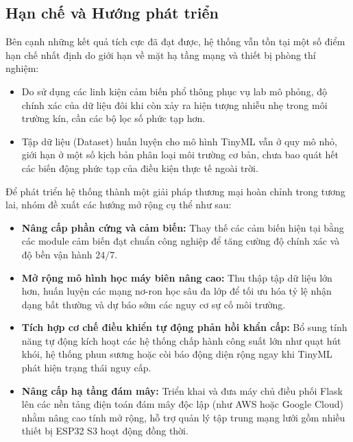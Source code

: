 \subsection{Hạn chế và Hướng phát triển}
Bên cạnh những kết quả tích cực đã đạt được, hệ thống vẫn tồn tại một số điểm hạn chế nhất định do giới hạn về mặt hạ tầng mạng và thiết bị phòng thí nghiệm:
\begin{itemize}
    \item Do sử dụng các linh kiện cảm biến phổ thông phục vụ lab mô phỏng, độ chính xác của dữ liệu đôi khi còn xảy ra hiện tượng nhiễu nhẹ trong môi trường kín, cần các bộ lọc số phức tạp hơn.
    \item Tập dữ liệu (Dataset) huấn luyện cho mô hình TinyML vẫn ở quy mô nhỏ, giới hạn ở một số kịch bản phân loại môi trường cơ bản, chưa bao quát hết các biến động phức tạp của điều kiện thực tế ngoài trời.
\end{itemize}

Để phát triển hệ thống thành một giải pháp thương mại hoàn chỉnh trong tương lai, nhóm đề xuất các hướng mở rộng cụ thể như sau:
\begin{itemize}
    \item \textbf{Nâng cấp phần cứng và cảm biến:} Thay thế các cảm biến hiện tại bằng các module cảm biến đạt chuẩn công nghiệp để tăng cường độ chính xác và độ bền vận hành $24/7$.
    \item \textbf{Mở rộng mô hình học máy biên nâng cao:} Thu thập tập dữ liệu lớn hơn, huấn luyện các mạng nơ-ron học sâu đa lớp để tối ưu hóa tỷ lệ nhận dạng bất thường và dự báo sớm các nguy cơ sự cố môi trường.
    \item \textbf{Tích hợp cơ chế điều khiển tự động phản hồi khẩn cấp:} Bổ sung tính năng tự động kích hoạt các hệ thống chấp hành công suất lớn như quạt hút khói, hệ thống phun sương hoặc còi báo động diện rộng ngay khi TinyML phát hiện trạng thái nguy cấp.
    \item \textbf{Nâng cấp hạ tầng đám mây:} Triển khai và đưa máy chủ điều phối Flask lên các nền tảng điện toán đám mây độc lập (như AWS hoặc Google Cloud) nhằm nâng cao tính mở rộng, hỗ trợ quản lý tập trung mạng lưới gồm nhiều thiết bị ESP32 S3 hoạt động đồng thời.
\end{itemize}